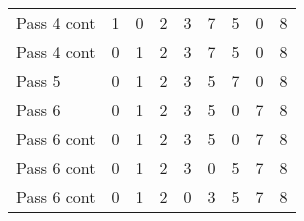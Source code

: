 \documentclass{article}
\begin{document}
\begin{tabular}{l*{7}{c}r}
                                                                                                                                                                                                                                                                        Pass 4 cont  & 1 & 0 & 2 & 3 & 7 & 5 & 0  & 8 \\
                                                                                                                                                                                                                                                                                Pass 4 cont  & 0 & 1 & 2 & 3 & 7 & 5 & 0  & 8 \\
                                                                                                                                                                                                                                                                                        Pass 5       & 0 & 1 & 2 & 3 & 5 & 7 & 0  & 8 \\
                                                                                                                                                                                                                                                                                                Pass 6       & 0 & 1 & 2 & 3 & 5 & 0 & 7  & 8 \\
                                                                                                                                                                                                                                                                                                        Pass 6 cont  & 0 & 1 & 2 & 3 & 5 & 0 & 7  & 8 \\
                                                                                                                                                                                                                                                                                                                Pass 6 cont  & 0 & 1 & 2 & 3 & 0 & 5 & 7  & 8 \\
                                                                                                                                                                                                                                                                                                                        Pass 6 cont  & 0 & 1 & 2 & 0 & 3 & 5 & 7  & 8 \\

\end{tabular}
\end{document}
